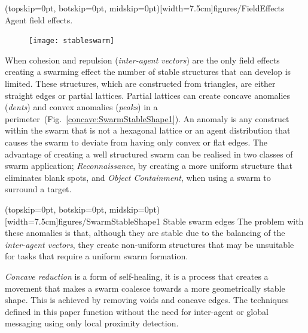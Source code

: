 \documentclass{ieeeaccess}
\begin{document}
\Figure[t!](topskip=0pt, botskip=0pt, midskip=0pt)[width=7.5cm]{figures/FieldEffects}
{Agent field effects.\label{methods:FieldEffects}}
\begin{figure}
	\texttt{[image: stableswarm]}
\end{figure}
When cohesion and repulsion (\textit{inter-agent vectors}) are the only field effects creating a swarming effect the number of stable structures that can develop is limited. These structures, which are constructed from triangles, are either straight edges or partial lattices. Partial lattices can create concave anomalies (\textit{dents}) and convex anomalies (\textit{peaks}) in a perimeter~(Fig.~\ref{concave:SwarmStableShape1}). An anomaly is any construct within the swarm that is not a hexagonal lattice or an agent distribution that causes the swarm to deviate from having only convex or flat edges. The advantage of creating a well structured swarm can be realised in two classes of swarm application; \textit{Reconnaissance}, by creating a more uniform structure that eliminates blank spots, and \textit{Object Containment}, when using a swarm to surround a target.  

\Figure[t!](topskip=0pt, botskip=0pt, midskip=0pt)[width=7.5cm]{figures/SwarmStableShape1}
{Stable swarm edges\label{concave:SwarmStableShape1}}
The problem with these anomalies is that, although they are stable due to the balancing of the \textit{inter-agent vectors}, they create non-uniform structures that may be unsuitable for tasks that require a uniform swarm formation.

\textit{Concave reduction} is a form of self-healing, it is a process that creates a movement that makes a swarm coalesce towards a more geometrically stable shape. This is achieved by removing voids and concave edges. The techniques defined in this paper function without the need for inter-agent or global messaging using only local proximity detection.
\end{document}
